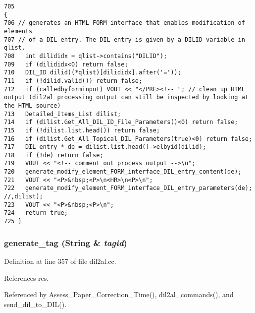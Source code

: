 \footnotesize\begin{verbatim}705                                                                        {
706 // generates an HTML FORM interface that enables modification of elements
707 // of a DIL entry. The DIL entry is given by a DILID variable in qlist.
708   int dilididx = qlist->contains("DILID");
709   if (dilididx<0) return false;
710   DIL_ID dilid((*qlist)[dilididx].after('='));
711   if (!dilid.valid()) return false;
712   if (calledbyforminput) VOUT << "</PRE><!-- "; // clean up HTML output (dil2al processing output can still be inspected by looking at the HTML source)
713   Detailed_Items_List dilist;
714   if (dilist.Get_All_DIL_ID_File_Parameters()<0) return false;
715   if (!dilist.list.head()) return false;
716   if (dilist.Get_All_Topical_DIL_Parameters(true)<0) return false;
717   DIL_entry * de = dilist.list.head()->elbyid(dilid);
718   if (!de) return false;
719   VOUT << "<!-- comment out process output -->\n";
720   generate_modify_element_FORM_interface_DIL_entry_content(de);
721   VOUT << "<P>&nbsp;<P>\n<HR>\n<P>\n";
722   generate_modify_element_FORM_interface_DIL_entry_parameters(de); //,dilist);
723   VOUT << "<P>&nbsp;<P>\n";
724   return true;
725 }
\end{verbatim}\normalsize 
{}
\subsubsection{ generate\_\-tag ({\bf String} \& {\em tagid})}\label{dil2al_8hh_a210}




Definition at line 357 of file dil2al.cc.

References res.

Referenced by Assess\_\-Paper\_\-Correction\_\-Time(), dil2al\_\-commands(), and send\_\-dil\_\-to\_\-DIL().



